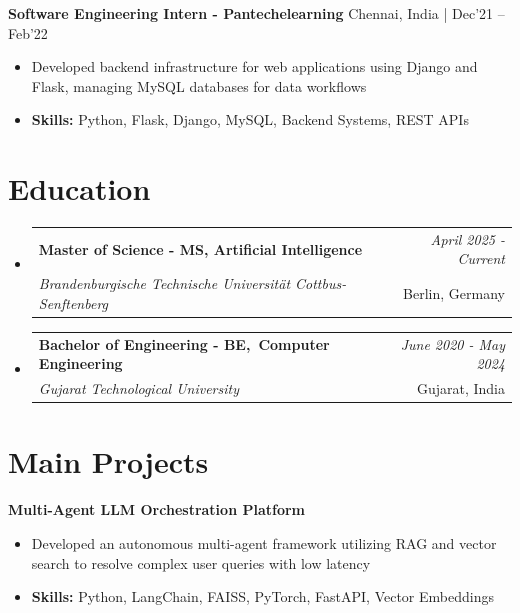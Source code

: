 \documentclass[a4paper,11pt]{article}
\makeatletter
\newcommand{\resumeSubheading}[4]{
\vspace{0.5mm}\item
    \begin{tabular*}{0.98\textwidth}[t]{l@{\extracolsep{\fill}}r}
        \textbf{#1} & \textit{\footnotesize{#4}} \\
        \textit{\footnotesize{#3}} &  \footnotesize{#2}\\
    \end{tabular*}
    \vspace{-2.4mm}
}
\makeatother
\begin{document}
\vspace{1mm}
  \textbf{ Software Engineering Intern - Pantechelearning} \hfill Chennai, India | Dec'21 -- Feb'22
\vspace{-1.5mm} %
\begin{itemize}
  \item Developed backend infrastructure for web applications using Django and Flask, managing MySQL databases for data workflows
\vspace{-2mm}
  \item \textbf{Skills:} Python, Flask, Django, MySQL, Backend Systems, REST APIs
\end{itemize}\section{\textbf{Education}}
\vspace{-0.4mm}

\begin{itemize}
\resumeSubheading
{Master of Science - MS, Artificial Intelligence }{Berlin, Germany}
{Brandenburgische Technische Universität Cottbus-Senftenberg  }{April 2025 - Current}

\vspace{1.0mm} %
\resumeSubheading
{Bachelor of Engineering - BE, Computer Engineering  }{Gujarat, India}
{Gujarat Technological University }{June 2020 - May 2024}

\end{itemize}
\section{\textbf{Main Projects}}

\vspace{1mm}
  \textbf{Multi-Agent LLM Orchestration Platform  } 
\vspace{-1.5mm} %
\begin{itemize}
  \item Developed an autonomous multi-agent framework utilizing RAG and vector search to resolve complex user queries with low latency
\vspace{-3mm}
  \item \textbf{Skills:} Python, LangChain, FAISS, PyTorch, FastAPI, Vector Embeddings
\end{itemize}
\end{document}
